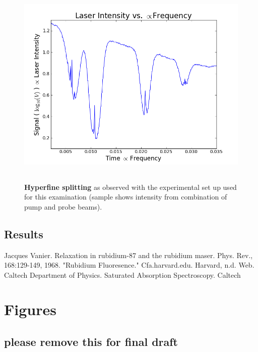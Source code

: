 \documentclass[paper=a4, fontsize=11pt]{scrartcl} %
\numberwithin{equation}{section}
\numberwithin{figure}{section}
\numberwithin{table}{section}
\begin{document}
\begin{figure}[h] \begin{center}
  \includegraphics[height=100mm]{3-1-001.png}
  \caption{\textbf{Hyperfine splitting} as observed with the experimental set up used for this examination (sample shows intensity from combination of pump and probe beams). }
  \label{fig:satabsorb1}
\end{center} \end{figure}

\subsection{Results}




\begin{thebibliography}{99}
Jacques Vanier. Relaxation in rubidium-87 and the
  rubidium maser. Phys. Rev., 168:129-149, 1968.
"Rubidium Fluoresence." Cfa.harvard.edu. Harvard,
  n.d. Web.
Caltech Department of Physics. Saturated Absorption
Spectroscopy. Caltech
\end{thebibliography}



\section{Figures}

\subsection{please remove this for final draft}


\end{document}
